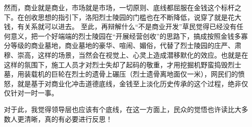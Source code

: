 \documentclass[UTF-8, a4paper]{ctexart}
\begin{document}
	然而，商业就是商业，市场就是市场，一切原则、底线都屈服在金钱这个标杆之下。在创收思想的指引下，洛阳烈士陵园的门槛也在不断降低，说穿了就是花大钱，有关系就可以进去。
	至此，再辩解什么“不是商业开发”草民觉得已经没有任何意义，把一个好端端的烈士陵园在“开展经营创收”的思路下，搞成按照金钱多寡分等级的商业墓地，商业墓地的豪华、喧闹、媚俗，代替了烈士陵园的庄严、肃穆、崇高，这样的场景，当然会在视觉上、心灵上造成潜移默化的效应。也就是在这样的氛围下，施工人员才对烈士失却了起码的敬重，才用挖掘机野蛮捣毁烈士墓，用装载机的巨轮在烈士的遗骨上碾压（烈士遗骨离地面仅一米），网民们的愤怒，就是基于对商业化冲击道德底线，金钱至上淡化历史传承的这个过程，绝非仅仅针对一时一事。

	对于此，我觉得领导层也应该有个底线，在这一方面上，民众的觉悟也许读比大多数人更清晰，真的有必要进行反思！
	
	
	
\end{document}
